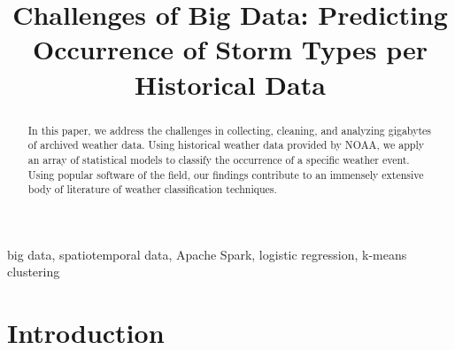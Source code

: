 \documentclass[conference]{IEEEtran}
\begin{document}
\title{Challenges of Big Data: Predicting Occurrence of Storm Types per Historical Data}
\author{
\and
{}
\and
{}
}

\maketitle

\begin{abstract}

In this paper, we address the challenges in collecting, cleaning, and analyzing gigabytes of archived weather data. Using historical weather data provided by NOAA, we apply an array of statistical models to classify the occurrence of a specific weather event. Using popular software of the field, our findings contribute to an immensely extensive body of literature of weather classification techniques.

\end{abstract}

\begin{IEEEkeywords}
big data, spatiotemporal data, Apache Spark, logistic regression, k-means clustering
\end{IEEEkeywords}

\section{Introduction}
\end{document}
